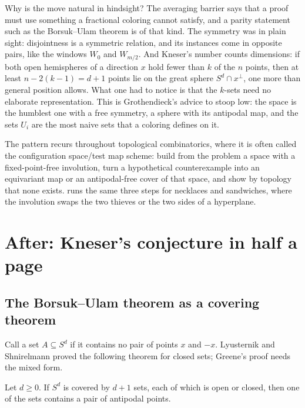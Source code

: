 \begin{refsection}
Why is the move natural in hindsight? The averaging barrier says that a proof must use something a fractional coloring cannot satisfy, and a parity statement such as the Borsuk--Ulam theorem is of that kind. The symmetry was in plain sight: disjointness is a symmetric relation, and its instances come in opposite pairs, like the windows $W_0$ and $W_{m/2}$. And Kneser's number counts dimensions: if both open hemispheres of a direction $x$ hold fewer than $k$ of the $n$ points, then at least $n-2(k-1)=d+1$ points lie on the great sphere $S^d\cap x^\perp$, one more than general position allows. What one had to notice is that the $k$-sets need no elaborate representation. This is Grothendieck's advice to stoop low: the space is the humblest one with a free symmetry, a sphere with its antipodal map, and the sets $U_i$ are the most naive sets that a coloring defines on it.

The pattern recurs throughout topological combinatorics, where it is often called the configuration space/test map scheme: build from the problem a space with a fixed-point-free involution, turn a hypothetical counterexample into an equivariant map or an antipodal-free cover of that space, and show by topology that none exists.  runs the same three steps for necklaces and sandwiches, where the involution swaps the two thieves or the two sides of a hyperplane.

\section{After: Kneser's conjecture in half a page}\label{sec:kneser:after1}

\subsection{The Borsuk--Ulam theorem as a covering theorem}

Call a set $A\subseteq S^d$  if it contains no pair of points $x$ and $-x$. Lyusternik and Shnirelmann proved the following theorem for closed sets; Greene's proof needs the mixed form.

\begin{theorem}\label{thm:kneser:ls}
Let $d\ge0$. If $S^d$ is covered by $d+1$ sets, each of which is open or closed, then one of the sets contains a pair of antipodal points.
\end{theorem}


\end{refsection}
